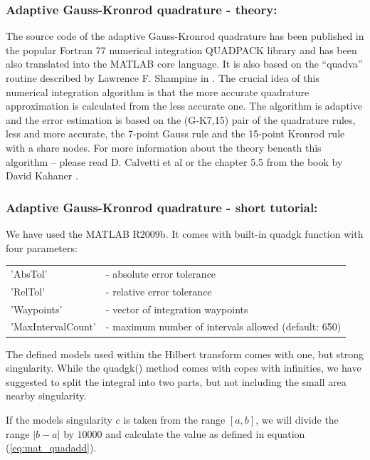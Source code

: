\documentclass[12pt,twoside,a4paper]{article}
\numberwithin{equation}{subsection}
\numberwithin{figure}{subsection}
\begin{document}
\subsubsection*{Adaptive Gauss-Kronrod quadrature - theory:}

The source code of the adaptive Gauss-Kronrod quadrature has been published in the popular Fortran 77 numerical integration QUADPACK library and has been also translated into the MATLAB core language. It is also based on the ``quadva'' routine described by Lawrence F. Shampine in \cite{shampine_vectorized}. The crucial idea of this numerical integration algorithm is that the more accurate quadrature approximation is calculated from the less accurate one. The algorithm is adaptive and the error estimation is based on the (G-K7,15) pair of the quadrature rules, less and more accurate, the 7-point Gauss rule and the 15-point Kronrod rule with a share nodes. For more information about the theory beneath this algorithm -- please read D. Calvetti et al \cite{calvetti_computation} or the chapter 5.5 from the book by David Kahaner \cite{kahaner_numerical}.

\subsubsection*{Adaptive Gauss-Kronrod quadrature - short tutorial:}

We have used the MATLAB \textregistered R2009b. It comes with built-in quadgk function with four parameters:


\begin{tabular}{l l}
  'AbsTol'           & - absolute error tolerance \\
  'RelTol'           & - relative error tolerance \\
  'Waypoints'        & - vector of integration waypoints \\
  'MaxIntervalCount' & - maximum number of intervals allowed (default: 650) \\
\end{tabular}

The defined models used within the Hilbert transform comes with one, but strong singularity. While the quadgk() method comes with copes with infinities, we have suggested to split the integral into two parts, but not including the small area nearby singularity.

If the models singularity $c$ is taken from the range $[a, b]$, we will divide the range $|b-a|$ by $10000$ and calculate the value as defined in equation (\ref{eq:mat_quadadd}). 
 
\end{document}
